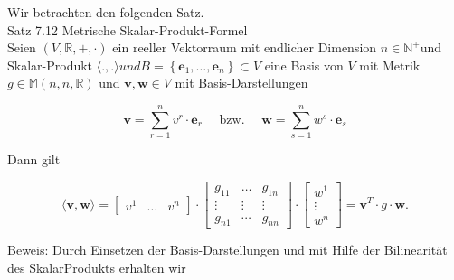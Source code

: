 \documentclass[10pt]{article}
\begin{document}
Wir betrachten den folgenden Satz.\\
Satz 7.12 Metrische Skalar-Produkt-Formel\\
Seien $(V, \mathbb{R},+, \cdot)$ ein reeller Vektorraum mit endlicher Dimension $n \in \mathbb{N}^{+}$und Skalar-Produkt $\langle.,$.$\rangle und B=\left\{\mathbf{e}_{1}, \ldots, \mathbf{e}_{n}\right\} \subset V$ eine Basis von $V$ mit Metrik $g \in \mathbb{M}(n, n, \mathbb{R})$ und $\mathbf{v}, \mathbf{w} \in V$ mit Basis-Darstellungen


\begin{equation*}
\mathbf{v}=\sum_{r=1}^{n} v^{r} \cdot \mathbf{e}_{r} \quad \text { bzw. } \quad \mathbf{w}=\sum_{s=1}^{n} w^{s} \cdot \mathbf{e}_{s} \tag{7.96}
\end{equation*}


Dann gilt

\[
\langle\mathbf{v}, \mathbf{w}\rangle=\left[\begin{array}{lll}
v^{1} & \ldots & v^{n}
\end{array}\right] \cdot\left[\begin{array}{ccc}
g_{11} & \ldots & g_{1 n}  \tag{7.97}\\
\vdots & \vdots & \vdots \\
g_{n 1} & \cdots & g_{n n}
\end{array}\right] \cdot\left[\begin{array}{c}
w^{1} \\
\vdots \\
w^{n}
\end{array}\right]=\mathbf{v}^{T} \cdot g \cdot \mathbf{w} .
\]

Beweis: Durch Einsetzen der Basis-Darstellungen und mit Hilfe der Bilinearität des SkalarProdukts erhalten wir
\end{document}
